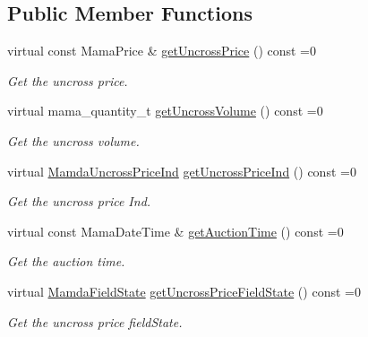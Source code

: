 \subsection*{Public Member Functions}
\begin{CompactItemize}
\item 
virtual const Mama\-Price \& \hyperlink{classWombat_1_1MamdaAuctionRecap_6a54a4b7e3c25078a631192d8af96b1f}{get\-Uncross\-Price} () const =0
\begin{CompactList}\small\item\em Get the uncross price. \item\end{CompactList}\item 
virtual mama\_\-quantity\_\-t \hyperlink{classWombat_1_1MamdaAuctionRecap_d6d2a20927c91f960d10d2820c154998}{get\-Uncross\-Volume} () const =0
\begin{CompactList}\small\item\em Get the uncross volume. \item\end{CompactList}\item 
virtual \hyperlink{namespaceWombat_4f0ec767cbe150ee160f65e719e76226}{Mamda\-Uncross\-Price\-Ind} \hyperlink{classWombat_1_1MamdaAuctionRecap_867a8e076b348cc2492faeb251886cc1}{get\-Uncross\-Price\-Ind} () const =0
\begin{CompactList}\small\item\em Get the uncross price Ind. \item\end{CompactList}\item 
virtual const Mama\-Date\-Time \& \hyperlink{classWombat_1_1MamdaAuctionRecap_29766366c4a151a36917987874e63d90}{get\-Auction\-Time} () const =0
\begin{CompactList}\small\item\em Get the auction time. \item\end{CompactList}\item 
virtual \hyperlink{namespaceWombat_93aac974f2ab713554fd12a1fa3b7d2a}{Mamda\-Field\-State} \hyperlink{classWombat_1_1MamdaAuctionRecap_e18a4d3e141bc54c23b8e36c54e5b073}{get\-Uncross\-Price\-Field\-State} () const =0
\begin{CompactList}\small\item\em Get the uncross price field\-State. \item\end{CompactList}\item 

\end{CompactItemize}
